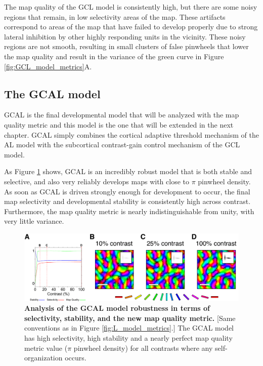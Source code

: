 \documentclass[phd,ianc,twoside]{infthesis}
\begin{document}
The map quality of the GCL model is consistently high, but there are some
noisy regions that remain, in low selectivity areas of the map. These
artifacts correspond to areas of the map that have failed to develop
properly due to strong lateral inhibition by other highly responding
units in the vicinity. These noisy regions are not smooth, resulting in
small clusters of false pinwheels that lower the map quality and result
in the variance of the green curve in Figure \ref{fig:GCL_model_metrics}A.


\subsection{The GCAL model}

GCAL is the final developmental model that will be analyzed with the map
quality metric and this model is the one that will be extended in the
next chapter. GCAL simply combines the cortical adaptive threshold
mechanism of the AL model with the subcortical contrast-gain control
mechanism of the GCL model.

As Figure \ref{fig:GCAL_model_metrics} shows, GCAL is an incredibly
robust model that is both stable and selective, and also very reliably
develops maps with close to
$\pi$ pinwheel density. As soon as GCAL is driven strongly enough for
development to occur, the final map selectivity and developmental
stability is consistently high across contrast. Furthermore, the map
quality metric is nearly indistinguishable from unity, with very little
variance.

\begin{figure}
\centerline{
\includegraphics[width=1\textwidth]{./figures/GCAL.pdf}
}
\caption[]{{\bf Analysis of the GCAL model robustness in terms of
    selectivity, stability, and the new map quality metric.}
  [Same conventions as in Figure \ref{fig:L_model_metrics}.]
  The GCAL model has high selectivity, high stability
  and a nearly perfect map quality metric value ($\pi$ pinwheel
  density) for all contrasts where any self-organization occurs.}
\label{fig:GCAL_model_metrics}
\end{figure}
\end{document}
